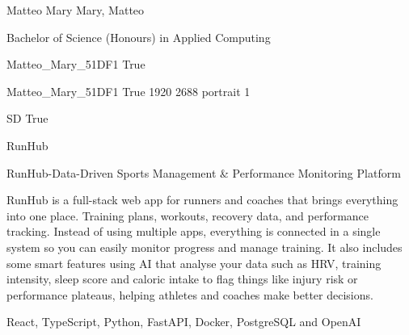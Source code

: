 
\begingroup{}\relax



\def\Key{Matteo_Mary_51DF1}

{Matteo Mary}
{Mary, Matteo}

{Bachelor of Science (Honours) in Applied Computing}

{Matteo_Mary_51DF1}
{True}

{Matteo_Mary_51DF1}
{True}
{1920}
{2688}
{portrait}
{1}

{SD}
{True}

{RunHub}

{RunHub-Data-Driven Sports Management \& Performance Monitoring Platform}

{RunHub is a full-stack web app for runners and coaches that brings everything into one place. Training plans, workouts, recovery data, and performance tracking. Instead of using multiple apps, everything is connected in a single system so you can easily monitor progress and manage training. It also includes some smart features using AI that analyse your data such as HRV, training intensity, sleep score and caloric intake to flag things like injury risk or performance plateaus, helping athletes and coaches make better decisions.}

{React, TypeScript, Python, FastAPI, Docker, PostgreSQL and OpenAI}

